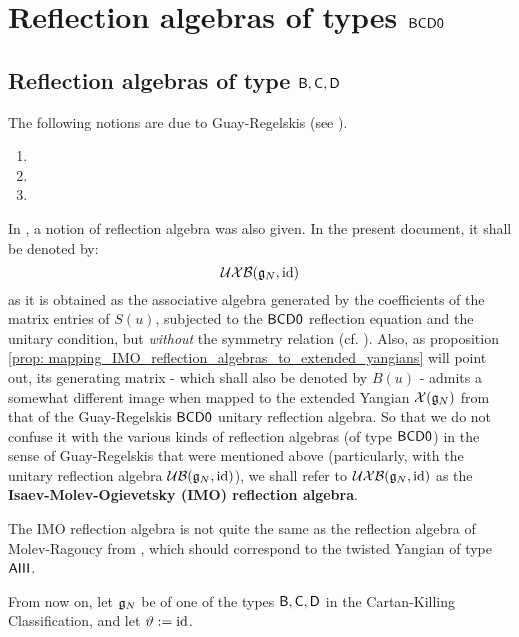 \section{\texorpdfstring{Reflection algebras of types $\mathsf{B}\mathsf{C}\mathsf{D}\mathsf{0}$}{}}
    \subsection{Reflection algebras of type \texorpdfstring{$\mathsf{B}, \mathsf{C}, \mathsf{D}$}{}}
        The following notions are due to Guay-Regelskis (see \cite{guay_regelskis_twisted_yangians_for_symmetric_pairs_of_types_BCD}).
        \begin{definition} \label{def: (extended)_reflection_algebras} 
            \begin{enumerate}
                \item 
                \item 
                \item 
            \end{enumerate}
        \end{definition}
        \begin{convention} \label{conv: IMO_reflection_algebras}
            In \cite{isaev_molev_ogievetsky_fusion_for_brauer_algebras_2}, a notion of reflection algebra was also given. In the present document, it shall be denoted by:
                $$\mathcal{UXB}(\mathfrak{g}_N, \mathrm{id})$$
            as it is obtained as the associative algebra generated by the coefficients of the matrix entries of $S(u)$, subjected to the $\mathsf{B}\mathsf{C}\mathsf{D}\mathsf{0}$ reflection equation and the unitary condition, but \textit{without} the symmetry relation (cf. \cite[Definition 3.1]{isaev_molev_ogievetsky_fusion_for_brauer_algebras_2}). Also, as proposition \ref{prop: mapping_IMO_reflection_algebras_to_extended_yangians} will point out, its generating matrix - which shall also be denoted by $B(u)$ - admits a somewhat different image when mapped to the extended Yangian $\mathcal{X}(\mathfrak{g}_N)$ from that of the Guay-Regelskis $\mathsf{B}\mathsf{C}\mathsf{D}\mathsf{0}$ unitary reflection algebra. So that we do not confuse it with the various kinds of reflection algebras (of type $\mathsf{B}\mathsf{C}\mathsf{D}\mathsf{0}$) in the sense of Guay-Regelskis that were mentioned above (particularly, with the unitary reflection algebra $\mathcal{UB}(\mathfrak{g}_N, \mathrm{id})$), we shall refer to $\mathcal{UXB}(\mathfrak{g}_N, \mathrm{id})$ as the \textbf{Isaev-Molev-Ogievetsky (IMO) reflection algebra}.
        \end{convention}
        \begin{remark}
            The IMO reflection algebra is not quite the same as the reflection algebra of Molev-Ragoucy from \cite{molev_ragoucy_representations_of_reflection_algebras}, which should correspond to the twisted Yangian of type $\mathsf{A} \mathsf{III}$.
        \end{remark}
        From now on, let $\mathfrak{g}_N$ be of one of the types $\mathsf{B}, \mathsf{C}, \mathsf{D}$ in the Cartan-Killing Classification, and let $\vartheta := \mathrm{id}$.


